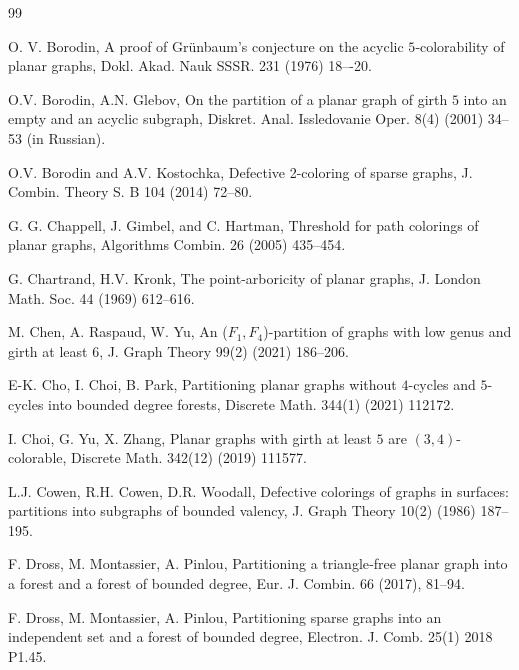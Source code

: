 \documentclass[11pt]{amsart} %
\theoremstyle{definition}
\begin{document}
\begin{thebibliography}{99}
	

	
O. V. Borodin, 
A proof of Grünbaum's conjecture on the acyclic 
$5$‐colorability of planar graphs, 
Dokl. Akad. Nauk SSSR. 231 (1976) 18–-20.

O.V. Borodin, A.N. Glebov, 
On the partition of a planar graph of girth $5$ 
into an empty and an acyclic subgraph, 
Diskret. Anal. Issledovanie Oper. 8(4) (2001) 34--53 (in Russian).

O.V. Borodin and A.V. Kostochka,
Defective 2-coloring of sparse graphs, 
J. Combin. Theory S. B 104 (2014) 72--80.
 
G. G. Chappell, J. Gimbel, and C. Hartman, 
Threshold for path colorings of planar graphs, 
Algorithms Combin. 26 (2005) 435--454.
 
G. Chartrand, H.V. Kronk, 
The point-arboricity of planar graphs, 
J. London Math. Soc. 44 (1969) 612--616.
 
M. Chen, A. Raspaud, W. Yu, 
An  ($F_1,F_4$)-partition of graphs 
with low genus and girth at least $6$,
J. Graph Theory 99(2) (2021) 186--206.
 

E-K. Cho, I. Choi, B. Park,
Partitioning planar graphs without $4$-cycles and $5$-cycles 
into bounded degree forests,
Discrete Math. 344(1) (2021) 112172.

I. Choi, G. Yu, X. Zhang,
Planar graphs with girth at least $5$ are $(3,4)$-colorable,
Discrete Math. 342(12) (2019) 111577.

L.J. Cowen, R.H. Cowen,  D.R. Woodall,
Defective colorings of graphs in surfaces:
partitions into subgraphs of bounded valency, 
J. Graph Theory 10(2) (1986) 187--195.

F. Dross, M. Montassier, A. Pinlou, 
Partitioning a triangle‐free planar graph 
into a forest and a forest of bounded degree, 
Eur. J. Combin. 66 (2017), 81--94.

F. Dross, M. Montassier, A. Pinlou, 
Partitioning sparse graphs into an independent set 
and a forest of bounded degree, 
Electron. J. Comb. 25(1) 2018 P1.45.


\end{thebibliography}
\end{document}
